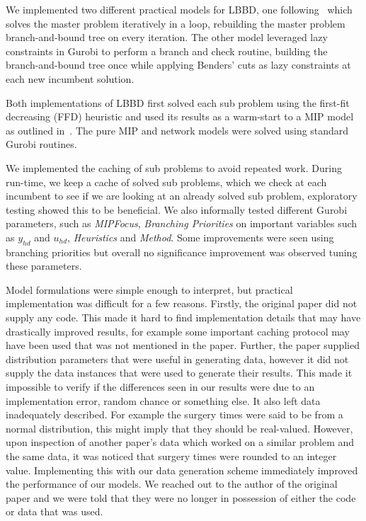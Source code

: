 We implemented two different practical models for LBBD, one following~\cite{roshanaei2017propagating} which solves the master problem iteratively in a loop, rebuilding the master problem branch-and-bound tree on every iteration. The other model leveraged lazy constraints in Gurobi to perform a branch and check routine\cite{LBBDBible}, building the branch-and-bound tree once while applying Benders' cuts as lazy constraints at each new incumbent solution. 

Both implementations of LBBD first solved each sub problem using the first-fit decreasing (FFD) heuristic\cite{Fazel} and used its results as a warm-start to a MIP model as outlined in~\cite{roshanaei2017propagating}. The pure MIP and network models were solved using standard Gurobi routines. 

We implemented the caching of sub problems to avoid repeated work. During run-time, we keep a cache of solved sub problems, which we check at each incumbent to see if we are looking at an already solved sub problem, exploratory testing showed this to be beneficial. We also informally tested different Gurobi parameters, such as \textit{MIPFocus}, \textit{Branching Priorities} on important variables such as $y_{hd}$ and $u_{hd}$, \textit{Heuristics} and \textit{Method}. Some improvements were seen using branching priorities but overall no significance improvement was observed tuning these parameters. 

Model formulations were simple enough to interpret, but practical implementation was difficult for a few reasons. Firstly, the original paper did not supply any code. This made it hard to find implementation details that may have drastically improved results, for example some important caching protocol may have been used that was not mentioned in the paper. Further, the paper supplied distribution parameters that were useful in generating data, however it did not supply the data instances that were used to generate their results. This made it impossible to verify if the differences seen in our results were due to an implementation error, random chance or something else. It also left data inadequately described. For example the surgery times were said to be from a normal distribution, this might imply that they should be real-valued. However, upon inspection of another paper's data which worked on a similar problem\cite{guo} and the same data, it was noticed that surgery times were rounded to an integer value. Implementing this with our data generation scheme immediately improved the performance of our models. We reached out to the author of the original paper and we were told that they were no longer in possession of either the code or data that was used. 

